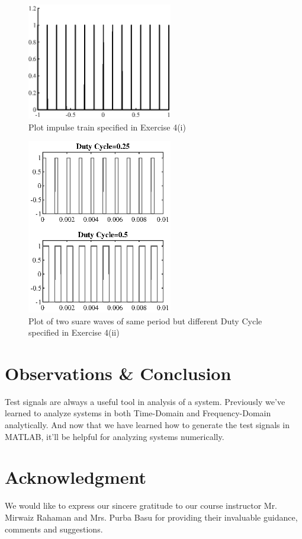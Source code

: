 \documentclass[12pt,conference,a4paper,twocolumn]{IEEEtran}
\begin{document}
\begin{figure}[h!]
\centering
\includegraphics[width=2.5in]{exc4_a.eps}
\caption{Plot impulse train specified in Exercise 4(i)}
\end{figure}

\begin{figure}[h!]
\centering
\includegraphics[width=2.5in]{exc4_b.eps}
\caption{Plot of two suare waves of same period but different Duty Cycle specified in Exercise 4(ii)}
\end{figure}


\section{Observations \& Conclusion}
Test signals are always a useful tool in analysis of a system. Previously we've learned to analyze systems in both Time-Domain and Frequency-Domain analytically. And now that we have learned how to generate the test signals in MATLAB, it'll be helpful for analyzing systems numerically. 

\section{Acknowledgment}
We would like to express our sincere gratitude to our course instructor Mr. Mirwaiz Rahaman and Mrs. Purba Basu for providing their invaluable guidance, comments and suggestions.
\end{document}
